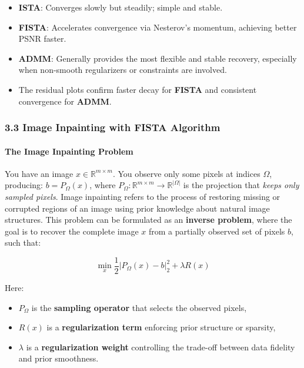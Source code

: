 \documentclass[11pt]{article}
\providecommand{\tightlist}{%
      \setlength{\itemsep}{0pt}\setlength{\parskip}{0pt}}
\begin{document}
\begin{itemize}
\tightlist
\item
  \textbf{ISTA}: Converges slowly but steadily; simple and stable.
\item
  \textbf{FISTA}: Accelerates convergence via Nesterov's momentum,
  achieving better PSNR faster.
\item
  \textbf{ADMM}: Generally provides the most flexible and stable
  recovery, especially when non-smooth regularizers or constraints are
  involved.
\item
  The residual plots confirm faster decay for \textbf{FISTA} and
  consistent convergence for \textbf{ADMM}.
\end{itemize}

    \hypertarget{image-inpainting-with-fista-algorithm}{%
\subsubsection{\texorpdfstring{\textbf{3.3 Image Inpainting with FISTA
Algorithm}}{3.3 Image Inpainting with FISTA Algorithm}}\label{image-inpainting-with-fista-algorithm}}

\hypertarget{the-image-inpainting-problem}{%
\paragraph{\texorpdfstring{\textbf{The Image Inpainting
Problem}}{The Image Inpainting Problem}}\label{the-image-inpainting-problem}}

You have an image \(x \in \mathbb{R}^{m \times m}\). You observe only
some pixels at indices \(\Omega\), producing: \(b = P_\Omega(x)\), where
\(\displaystyle P_\Omega : \mathbb{R}^{m \times m} \to \mathbb{R}^{|\Omega|}\)
is the projection that \emph{keeps only sampled pixels}. Image
inpainting refers to the process of restoring missing or corrupted
regions of an image using prior knowledge about natural image
structures. This problem can be formulated as an \textbf{inverse
problem}, where the goal is to recover the complete image \(x\) from a
partially observed set of pixels \(b\), such that:

\[\underset{x}{\min} \frac{1}{2} | P_{\Omega}(x) - b |_2^2 + \lambda R(x)\]

Here:

\begin{itemize}
\tightlist
\item
  \(P_{\Omega}\) is the \textbf{sampling operator} that selects the
  observed pixels,
\item
  \(R(x)\) is a \textbf{regularization term} enforcing prior structure
  or sparsity,
\item
  \(\lambda\) is a \textbf{regularization weight} controlling the
  trade-off between data fidelity and prior smoothness.
\end{itemize}
\end{document}
